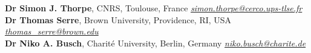 \documentclass[margin,line]{resume}
\begin{document}
\begin{resume}
	\textbf{Dr Simon J. Thorpe}, CNRS, Toulouse, France  \hfill \textsl{\href{mailto:simon.thorpe@cerco.ups-tlse.fr}{simon.thorpe@cerco.ups-tlse.fr}}\\
	\textbf{Dr Thomas Serre}, Brown University, Providence, RI, USA \hfill \textsl{\href{mailto:thomas_serre@brown.edu}{thomas\_serre@brown.edu}} \\
	\textbf{Dr Niko A. Busch}, Charité University, Berlin, Germany \hfill \textsl{\href{mailto:niko.busch@charite.de}{niko.busch@charite.de}} \\

\end{resume}
\end{document}
